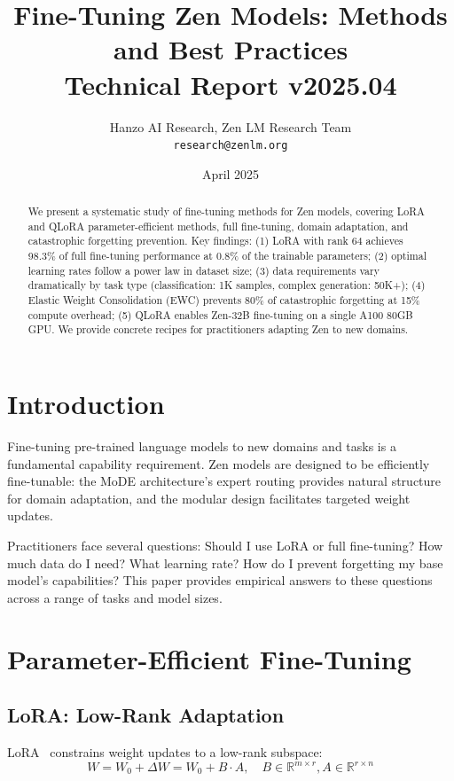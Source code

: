 \documentclass[11pt,a4paper]{article}
\title{\textbf{Fine-Tuning Zen Models: Methods and Best Practices}\\
\large Technical Report v2025.04}
\author{Hanzo AI Research, Zen LM Research Team\\
\texttt{research@zenlm.org}}
\date{April 2025}
\begin{document}
\maketitle

\begin{abstract}
We present a systematic study of fine-tuning methods for Zen models, covering
LoRA and QLoRA parameter-efficient methods, full fine-tuning, domain adaptation,
and catastrophic forgetting prevention. Key findings: (1) LoRA with rank 64 achieves
98.3\% of full fine-tuning performance at 0.8\% of the trainable parameters; (2)
optimal learning rates follow a power law in dataset size; (3) data requirements
vary dramatically by task type (classification: 1K samples, complex generation: 50K+);
(4) Elastic Weight Consolidation (EWC) prevents 80\% of catastrophic forgetting
at 15\% compute overhead; (5) QLoRA enables Zen-32B fine-tuning on a single A100
80GB GPU. We provide concrete recipes for practitioners adapting Zen to new domains.
\end{abstract}

\section{Introduction}

Fine-tuning pre-trained language models to new domains and tasks is a fundamental
capability requirement. Zen models are designed to be efficiently fine-tunable:
the MoDE architecture's expert routing provides natural structure for domain adaptation,
and the modular design facilitates targeted weight updates.

Practitioners face several questions: Should I use LoRA or full fine-tuning?
How much data do I need? What learning rate? How do I prevent forgetting my
base model's capabilities? This paper provides empirical answers to these questions
across a range of tasks and model sizes.

\section{Parameter-Efficient Fine-Tuning}

\subsection{LoRA: Low-Rank Adaptation}

LoRA~\cite{hu2021lora} constrains weight updates to a low-rank subspace:
\begin{equation}
W = W_0 + \Delta W = W_0 + B \cdot A, \quad B \in \mathbb{R}^{m \times r}, A \in \mathbb{R}^{r \times n}
\end{equation}
\end{document}
